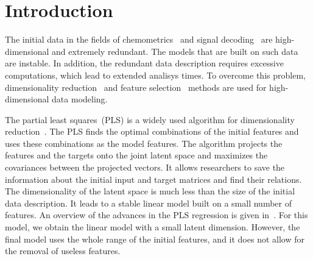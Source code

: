\documentclass[preprint,12pt]{elsarticle}
\theoremstyle{definition}
\begin{document}
\section{Introduction}

The initial data in the fields of chemometrics~\cite{karimi2014leukemia,lin2016equivalence} and signal decoding~\cite{eliseyev2014stable,eliseyev2012l1} are high-dimensional and extremely redundant.
The models that are built on such data are instable. 
In addition, the redundant data description requires excessive computations, which lead to extended analisys times. 
To overcome this problem, dimensionality reduction~\cite{chun2010sparse,mehmood2012review} and feature selection~\cite{katrutsa2015stress,li2017feature} methods are used  for high-dimensional data modeling. 

The partial least squares~(PLS) is a widely used algorithm for dimensionality reduction~\cite{lauzon2018sequential,engel2017kernel,biancolillo2017extension,hervas2018sparse}. 
The PLS finds the optimal combinations of the initial features and uses these combinations as the model features. 
The algorithm projects the features and the targets onto the joint latent space and maximizes the covariances between the projected vectors. 
It allows researchers to save the information about the initial input and target matrices and find their relations. 
The dimensionality of the latent space is much less than the size of the initial data description. 
It leads to a stable linear model built on a small number of features. 
An overview of the advances in the PLS regression is given in~\cite{rosipal2006overview,rosipal2011nonlinear}.
For this model, we obtain the linear model with a small latent dimension.
However, the final model uses the whole range of the initial features, and it does not allow for the removal of useless features. 
\end{document}
